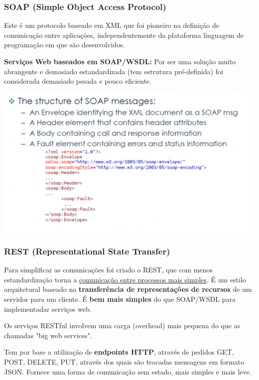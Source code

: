 \documentclass{article}
\begin{document}
\subsubsection*{SOAP (Simple Object Access Protocol)}

Este é um protocolo baseado em XML que foi pioneiro na definição de comunicação
entre aplicações, independentemente da plataforma linguagem de programação em que
são desenvolvidos.

\textbf{Serviços Web baseados em SOAP/WSDL:} Por ser uma solução muito abrangente e demasiado estandardizada
(tem estrutura pré-definida) foi considerada demasiado pesada e
pouco eficiente.

\begin{center}
  \includegraphics[scale=0.38]{65}
\end{center}

\pagebreak

\subsubsection*{REST (Representational State Transfer)}

Para simplificar as comunicações foi criado o REST, que com menos
estandardização torna a \uline{comunicação entre processos mais simples}.
É um estilo arquitetural baseado na \textbf{transferência de representações
de recursos} de um servidor para um cliente. É \textbf{bem mais simples}
do que SOAP/WSDL para implementadar serviços web.

Os serviços RESTful involvem uma carga (overhead) mais pequena do que
as chamadas "big web services".

\vspace{2mm}

Tem por base a utilização de \textbf{endpoints HTTP}, através de pedidos
GET, POST, DELETE, PUT, através dos quais são trocadas mensagens em formato
JSON. Fornece uma forma de comunicação sem estado, mais simples e
mais leve.
\end{document}
